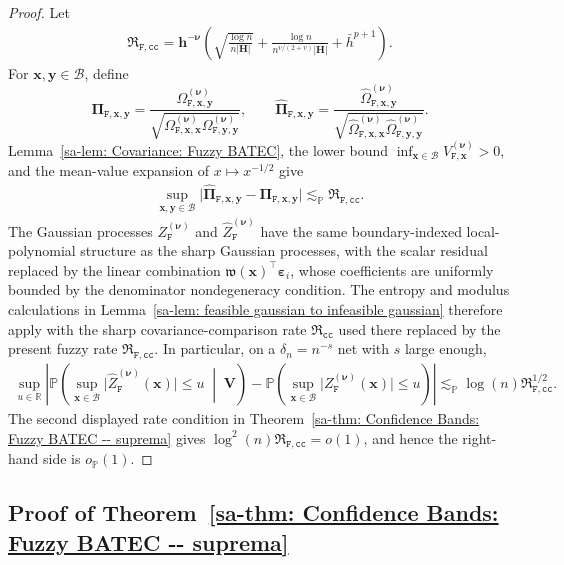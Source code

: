 \documentclass[10pt]{article}
\renewcommand{\P}{\mathbb{P}}
\newcommand{\reals}{\mathbb{R}}
\newcommand{\lessp}{\lesssim_{\mathbb{P}}}
\newcommand{\bh}{\mathbf{h}}
\newcommand{\bH}{\mathbf{H}}
\newcommand{\bV}{\mathbf{V}}
\newcommand{\bx}{\mathbf{x}}
\newcommand{\by}{\mathbf{y}}
\newcommand{\bnu}{\boldsymbol{\nu}}
\newcommand{\bPi}{\boldsymbol{\Pi}}
\newcommand{\B}{\mathcal{B}}
\begin{document}
\begin{proof}
Let
\begin{align*}
    \mathfrak{R}_{\mathtt{F,cc}}
    =
    \bh^{-\bnu}
    \left(
    \sqrt{\frac{\log n}{n|\bH|}}
    +\frac{\log n}{n^{v/(2+v)}|\bH|}
    +\bar h^{p+1}
    \right).
\end{align*}
For $\bx,\by\in\B$, define
\[
    \bPi_{\mathtt{F},\bx,\by}
    =\frac{\Omega_{\mathtt{F},\bx,\by}^{(\bnu)}}
    {\sqrt{\Omega_{\mathtt{F},\bx,\bx}^{(\bnu)}\Omega_{\mathtt{F},\by,\by}^{(\bnu)}}},
    \qquad
    \widehat{\bPi}_{\mathtt{F},\bx,\by}
    =\frac{\widehat{\Omega}_{\mathtt{F},\bx,\by}^{(\bnu)}}
    {\sqrt{\widehat{\Omega}_{\mathtt{F},\bx,\bx}^{(\bnu)}\widehat{\Omega}_{\mathtt{F},\by,\by}^{(\bnu)}}}.
\]
Lemma~\ref{sa-lem: Covariance: Fuzzy BATEC}, the lower bound
$\inf_{\bx\in\B}V_{\mathtt{F},\bx}^{(\bnu)}>0$, and the mean-value expansion of $x\mapsto x^{-1/2}$ give
\begin{align*}
    \sup_{\bx,\by\in\B}
    \big|\widehat{\bPi}_{\mathtt{F},\bx,\by}
    -\bPi_{\mathtt{F},\bx,\by}\big|
    \lessp \mathfrak{R}_{\mathtt{F,cc}}.
\end{align*}
The Gaussian processes $Z_{\mathtt{F}}^{(\bnu)}$ and $\widehat Z_{\mathtt{F}}^{(\bnu)}$ have the same boundary-indexed local-polynomial structure as the sharp Gaussian processes, with the scalar residual replaced by the linear combination $\mathfrak w(\bx)^\top\boldsymbol{\varepsilon}_i$, whose coefficients are uniformly bounded by the denominator nondegeneracy condition. The entropy and modulus calculations in Lemma~\ref{sa-lem: feasible gaussian to infeasible gaussian} therefore apply with the sharp covariance-comparison rate $\mathfrak{R}_{\mathtt{cc}}$ used there replaced by the present fuzzy rate $\mathfrak{R}_{\mathtt{F,cc}}$. In particular, on a $\delta_n=n^{-s}$ net with $s$ large enough,
\begin{align*}
    \sup_{u \in \reals}
    \left|
    \P \left( \sup_{\bx \in \B} \big| \widehat{Z}_{\mathtt{F}}^{(\bnu)}(\bx) \big| \leq u \;\middle|\; \bV \right)
    - \P \left( \sup_{\bx \in \B} \big| Z_{\mathtt{F}}^{(\bnu)}(\bx) \big| \leq u \right)
    \right|
    \lessp \log(n)\mathfrak{R}_{\mathtt{F,cc}}^{1/2}.
\end{align*}
The second displayed rate condition in Theorem~\ref{sa-thm: Confidence Bands: Fuzzy BATEC -- suprema} gives $\log^2(n)\mathfrak{R}_{\mathtt{F,cc}}=o(1)$, and hence the right-hand side is $o_{\P}(1)$.
\end{proof}


\subsection{Proof of Theorem~\ref{sa-thm: Confidence Bands: Fuzzy BATEC -- suprema}}
\end{document}
